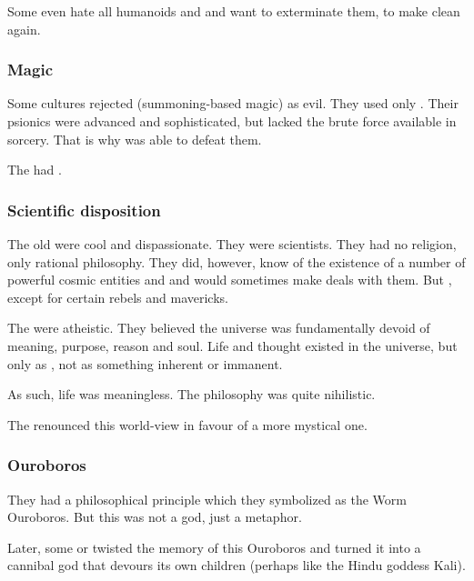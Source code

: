 Some \trueophidians{} even hate all humanoids and \dragons{} and want to exterminate them, to make \Miith{} clean again.





\subsubsection{Magic}
Some \ophidian{} cultures rejected  (summoning-based magic) as evil. 
They used only . 
Their psionics were advanced and sophisticated, but lacked the brute force available in sorcery. 
That is why  was able to defeat them. 

The {\quiljaaran} had . 





\subsubsection{Scientific disposition}
The old \ophidians{} were cool and dispassionate. 
They were scientists. 
They had no religion, only rational philosophy. 
They did, however, know of the existence of a number of powerful cosmic entities and  and would sometimes make deals with them. 
But , except for certain rebels and mavericks. 

The \ophidians were atheistic. 
They believed the universe was fundamentally devoid of meaning, purpose, reason and soul.
Life and thought existed in the universe, but only as , not as something inherent or immanent. 

As such, life was meaningless. 
The \ophidian philosophy was quite nihilistic. 

The  renounced this world-view in favour of a more mystical one.





\subsubsection{Ouroboros}
They had a philosophical principle which they symbolized as the Worm Ouroboros. 
But this was not a god, just a metaphor. 

Later, some  \ophidians or \quiljaaran twisted the memory of this Ouroboros and turned it into a cannibal god that devours its own children (perhaps like the Hindu goddess Kali). 





